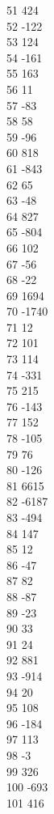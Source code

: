 { 51	424 \\
 52	-122 \\
 53	124 \\
 54	-161 \\
 55	163 \\
 56	11 \\
 57	-83 \\
 58	58 \\
 59	-96 \\
 60	818 \\
 61	-843 \\
 62	65 \\
 63	-48 \\
 64	827 \\
 65	-804 \\
 66	102 \\
 67	-56 \\
 68	-22 \\
 69	1694 \\
 70	-1740 \\
 71	12 \\
 72	101 \\
 73	114 \\
 74	-331 \\
 75	215 \\
 76	-143 \\
 77	152 \\
 78	-105 \\
 79	76 \\
 80	-126 \\
 81	6615 \\
 82	-6187 \\
 83	-494 \\
 84	147 \\
 85	12 \\
 86	-47 \\
 87	82 \\
 88	-87 \\
 89	-23 \\
 90	33 \\
 91	24 \\
 92	881 \\
 93	-914 \\
 94	20 \\
 95	108 \\
 96	-184 \\
 97	113 \\
 98	-3 \\
 99	326 \\
 100	-693 \\
 101	416 \\
}
